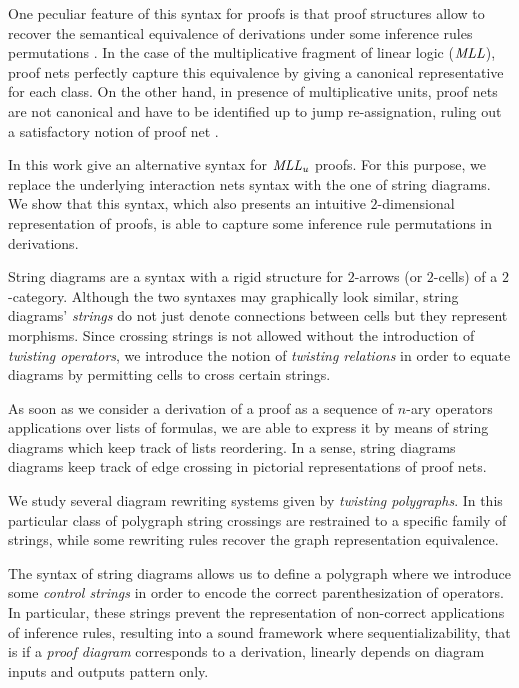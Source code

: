 \documentclass[a4paper]{article}
\begin{document}
One peculiar feature of this syntax for proofs is that proof structures allow to recover the semantical equivalence of derivations under some inference rules permutations \cite{lafint}. In the case of the multiplicative fragment of linear logic ($\mathit{MLL}$), proof nets perfectly capture this equivalence by giving a canonical representative for each class. On the other hand, in presence of multiplicative units, proof nets are not canonical \cite{MLLu} and have to  be identified up to jump re-assignation, ruling out a satisfactory notion of proof net \cite{noMLL}.

In this work give an alternative syntax for $\mathit{MLL_u}$ proofs. For this purpose, we replace the underlying interaction nets syntax with the one of string diagrams. We show that this syntax, which also presents an intuitive $2$-dimensional representation of proofs, is  able to capture some inference rule permutations in derivations.

String diagrams \cite{string} are a syntax with a rigid structure for $2$-arrows (or $2$-cells) of a $2$-category. Although the two syntaxes may graphically look similar, string diagrams' \emph{strings} do not just denote connections between cells but they represent morphisms.
Since crossing strings is not allowed without the introduction of \emph{twisting operators}, we introduce the notion of \emph{twisting relations} in order to equate diagrams by permitting cells to cross certain strings.

As soon as we consider a derivation of a proof as a sequence  of $n$-ary operators applications over lists of formulas, we are able to express it by means of string diagrams which  keep track of lists reordering. In a sense, string diagrams diagrams keep track of edge crossing in  pictorial representations of  proof nets.

We study several diagram rewriting systems given by \emph{twisting polygraphs}. In this particular class of polygraph \cite{Bur} string crossings are restrained to a specific family of strings, while some rewriting rules recover the graph representation equivalence.


The syntax of string diagrams allows us to define a polygraph where we introduce some \emph{control strings} in order to encode the correct parenthesization of operators. In particular, these strings prevent the representation of non-correct applications of inference rules,  resulting  into a sound framework where sequentializability, that is if a \emph{proof diagram} corresponds to a derivation, linearly depends on diagram inputs and outputs pattern only. 
\end{document}
